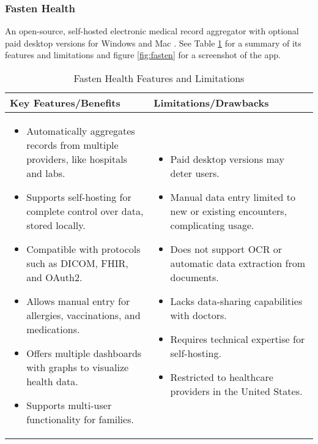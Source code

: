 \FloatBarrier
\clearpage

\subsubsection{Fasten Health}

An open-source, self-hosted electronic medical record aggregator with optional paid desktop versions for Windows and Mac \parencite{fasten}. See Table \ref{tab:fasten_health} for a summary of its features and limitations and figure \ref{fig:fasten} for a screenshot of the app.

\begin{table}[h!]
\centering
    \begin{tabular}{|p{}|p{}|}
    \hline
    \textbf{Key Features/Benefits} & \textbf{Limitations/Drawbacks} \\ \hline
    \begin{itemize}
        \item Automatically aggregates records from multiple providers, like hospitals and labs.
        \item Supports self-hosting for complete control over data, stored locally.
        \item Compatible with protocols such as DICOM, FHIR, and OAuth2.
        \item Allows manual entry for allergies, vaccinations, and medications.
        \item Offers multiple dashboards with graphs to visualize health data.
        \item Supports multi-user functionality for families.
    \end{itemize} &
    \begin{itemize}
        \item Paid desktop versions may deter users.
        \item Manual data entry limited to new or existing encounters, complicating usage.
        \item Does not support OCR or automatic data extraction from documents.
        \item Lacks data-sharing capabilities with doctors.
        \item Requires technical expertise for self-hosting.
        \item Restricted to healthcare providers in the United States.
    \end{itemize} \\ \hline
    \end{tabular}
\caption{Fasten Health Features and Limitations}
\label{tab:fasten_health}
\end{table}
